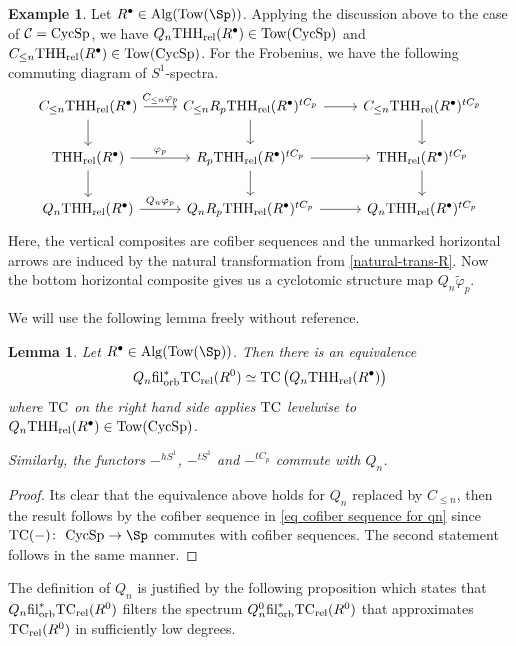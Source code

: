\documentclass[english,10pt]{amsart}
\newcommand{\rel}{\textup{rel}}
\newtheorem{lem}{Lemma}[section]
\theoremstyle{definition}
\newtheorem{exam}{Example}[section]
\numberwithin{equation}{section}
\DeclareMathOperator{\tc}{\ensuremath{\textup{TC}}}
\newcommand{\rtc}{\mathrm{TC}_{\rel}}
\newcommand{\rthh}{\mathrm{THH}_{\rel}}
\DeclareMathOperator{\cycsp}{\ensuremath{\textup{CycSp}}}
\newcommand{\filorb}{\mathrm{fil}^{*}_{\textup{orb}}}
\newcommand{\Tow}{\mathrm{Tow}}
\newcommand{\Alg}{\mathrm{Alg}}
\def\co{\colon\thinspace}
\begin{document}
\begin{exam}\label{exam qn and cn of may filtration}
Let $R^{\bullet}\in \Alg(\Tow(\Sp))$. 
Applying the discussion above to the case of $\mathcal{C} = \cycsp$, we have  $Q_n\rthh(R^{\bullet}) \in \mathrm{Tow}(\cycsp)$ and $C_{\leq n}\rthh(R^{\bullet}) \in \mathrm{Tow}(\cycsp)$. 
For the Frobenius, we have the following commuting diagram of $S^1$-spectra.
\begin{equation}\label{eq frobenius of cn and qn}
\begin{tikzcd}
{C}_{\leq n} \rthh(R^{\bullet})\ar[r,"{C}_{\leq n}\varphi_p"]  \ar[d]& \ar[d] C_{\leq n} R_p \rthh(R^{\bullet})^{tC_p} \ar[r]& \ar[d] C_{\leq n} \rthh(R^{\bullet})^{tC_p}\\
\rthh(R^{\bullet}) \ar[r,"\varphi_p"]\ar[d] &  R_p \rthh(R^{\bullet})^{tC_p} \ar[r] \ar[d]& \ar[d] \rthh(R^{\bullet})^{tC_p}\\
Q_n \rthh(R^{\bullet}) \ar[r,"Q_n\varphi_p"]& Q_n  R_p \rthh(R^{\bullet})^{tC_p} \ar[r] & Q_n \rthh(R^{\bullet})^{tC_p} 
\end{tikzcd}
\end{equation}
Here, the vertical composites are cofiber sequences and the unmarked horizontal arrows are induced by the natural transformation from \autoref{natural-trans-R}. Now the bottom horizontal composite gives us a cyclotomic structure map $Q_n \widetilde{\varphi}_p$.
\end{exam}



We will use the following lemma freely without reference. 

\begin{lem}\label{lemma qn of orbit is tc of qn}
Let $R^{\bullet}\in \Alg(\Tow(\Sp))$. Then there is an equivalence 
\[Q_n \filorb \rtc(R^0) \simeq \tc\big(Q_n\rthh(R^{\bullet})\big)\]
where $\tc$ on the right hand side  applies $\tc$ levelwise to $Q_n\rthh(R^{\bullet}) \in \mathrm{Tow}(\cycsp)$.

Similarly, the functors $-^{hS^1}$, $-^{tS^1}$ and $-^{tC_p}$ commute with $Q_n$.
\end{lem}
\begin{proof}
Its clear that the equivalence above holds for $Q_n$ replaced by $C_{\leq n}$, then the result follows by the cofiber sequence in \eqref{eq cofiber sequence for qn} since $\tc(-)\co \cycsp \to \Sp$ commutes with cofiber sequences. The second statement follows in the same manner. 
\end{proof}

The definition of $Q_n$ is justified by the following proposition which states that $Q_n \filorb \rtc(R^0)$ filters the spectrum $Q_n^0 \filorb \rtc(R^0)$  that approximates $\rtc(R^0)$ in sufficiently low  degrees.
\end{document}
